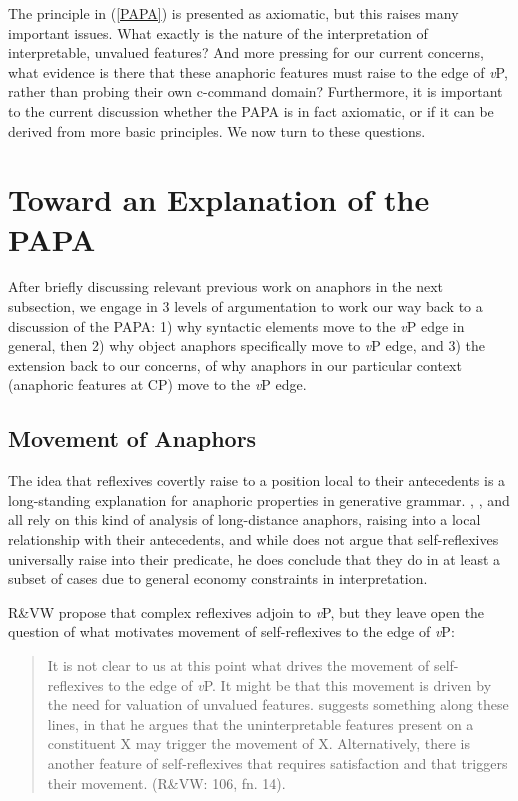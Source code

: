 The principle in (\ref{PAPA}) is presented as axiomatic, but this raises many important issues. What exactly is the nature of the interpretation of interpretable, unvalued features? And more pressing for our current concerns, what evidence is there that these anaphoric features must raise to the edge of \textit{v}P, rather than probing their own c-command domain? Furthermore, it is important to the current discussion whether the PAPA is in fact axiomatic, or if it can be derived from more basic principles. We now turn to these questions.

\section{Toward an Explanation of the PAPA} \label{ExplainPAPA}

After briefly discussing relevant previous work on anaphors in the next subsection, we engage in 3 levels of argumentation to work our way back to a discussion of the PAPA: 1) why syntactic elements move to the \textit{v}P edge in general, then 2) why object anaphors specifically move to \textit{v}P edge, and 3) the extension back to our concerns, of why anaphors in our particular context (anaphoric features at CP) move to the \textit{v}P edge. 

\subsection{Movement of Anaphors}
The idea that reflexives covertly raise to a position local to their antecedents is a long-standing explanation for anaphoric properties in generative grammar. \citet{Safir:2004}, \citet{Pica:1987}, and \citet{Cole:1990} all rely on this kind of analysis of long-distance anaphors, raising into a local relationship with their antecedents, and while \citet{Reuland:2011} does not argue that self-reflexives universally raise into their predicate, he does conclude that they do in at least a subset of cases due to general economy constraints in interpretation. 

R\&VW propose that complex reflexives adjoin to \textit{v}P, but they leave open the question of what motivates movement of self-reflexives to the edge of \textit{v}P: 

\begin{quote}
It is not clear to us at this point what drives the movement of self-reflexives to the edge of \textit{v}P. It might be that this movement is driven by the need for valuation of unvalued features. \citet{Boskovic:2007} suggests something along these lines, in that he argues that the uninterpretable features present on a constituent X may trigger the movement of X. Alternatively, there is another feature of self-reflexives that requires satisfaction and that triggers their movement. (R\&VW: 106, fn. 14).

\end{quote}

